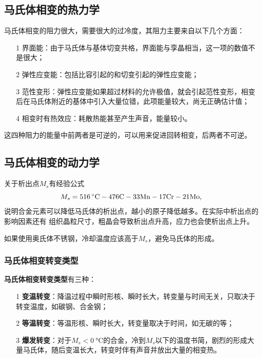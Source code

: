         \subsection{马氏体相变的热力学}
            马氏体相变的阻力很大，需要很大的过冷度，其阻力主要来自以下几个方面：
            \begin{itemize}
                \item[1] 界面能：由于马氏体与基体切变共格，界面能与孪晶相当，这一项的数值不是很大；
                \item[2] 弹性应变能：包括比容引起的和切变引起的弹性应变能；
                \item[3] 范性变形：弹性应变能如果超过材料的允许极值，就会引起范性变形，相变后在马氏体附近的基体中引入大量位错，此项能量较大，尚无正确估计值；
                \item[4] 相变时有热效应：耗散热能甚至产生声音，能量较小。
            \end{itemize}
            这四种阻力的能量中前两者是可逆的，可以用来促进回转相变，后两者不可逆。
        \subsection{马氏体相变的动力学}
            关于析出点$M_s$有经验公式
            \begin{equation}
                M_s=\SI{516}{\celsius}-476\ce{C}-33\ce{Mn}-17\ce{Cr}-21\ce{Mo},
            \end{equation}
            说明合金元素可以降低马氏体的析出点，越小的原子降低越多。在实际中析出点的影响因素还有
            组织晶粒尺寸，粗晶会导致析出点升高，应力也会使析出点上升。

            如果使用奥氏体不锈钢，冷却温度应该高于$M_s$，避免马氏体的形成。
            \subsubsection{马氏体相变转变类型}
                \textbf{马氏体相变转变类型}有三种：
                \begin{itemize}
                    \item[1] \textbf{变温转变}：降温过程中瞬时形核、瞬时长大，转变量与时间无关，只取决于转变温度，如碳钢、合金钢；
                    \item[2] \textbf{等温转变}：等温形核、瞬时长大，转变量取决于时间，如无碳的等；
                    \item[3] \textbf{爆发转变}：对于$M_s<\SI{0}{\celsius}$的合金，冷到$M_s$以下的温度书简，剧烈的形成大量马氏体，随后变温长大，转变时伴有声音并放出大量的相变热。
                \end{itemize}
